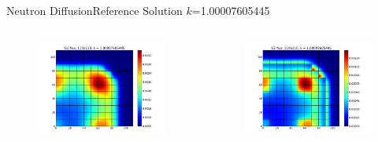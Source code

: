 \documentclass{beamer}
\begin{document}
\begin{frame}{Neutron Diffusion}{Reference Solution}%
  $k$=1.00007605445
  \begin{columns}
  \begin{column}{0.5\textwidth}
  \begin{figure}[h!]
    \centering
    \includegraphics[width=\textwidth]{../../graphics/g1_50_flux}
  \end{figure}
  \end{column}
  \begin{column}{0.5\textwidth}
  \begin{figure}[h!]
    \centering
    \includegraphics[width=\textwidth]{../../graphics/g2_50_flux}
  \end{figure}
  \end{column}
  \end{columns}
\end{frame}
\end{document}

